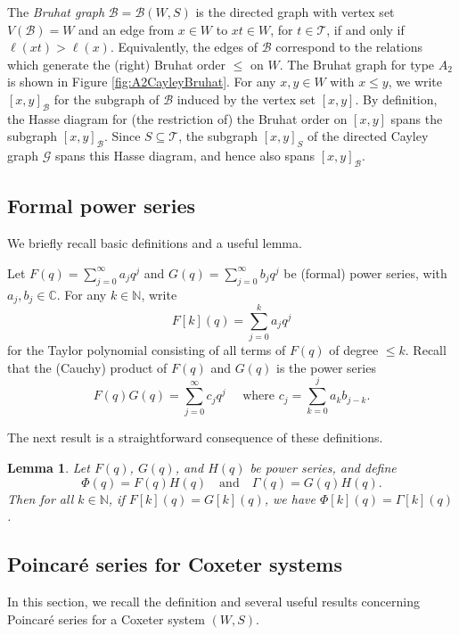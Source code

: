 \documentclass[11pt]{amsart}
\theoremstyle{plain}
\newtheorem{lemma}[thm]{Lemma}
\theoremstyle{definition}
\newcommand{\cG}{\mathcal{G}}
\newcommand{\N}{\mathbb{N}}
\newcommand{\C}{\mathbb{C}}
\newcommand{\cB}{\mathcal B}
\newcommand{\cT}{\mathcal T}
\numberwithin{equation}{subsection}
\begin{document}
The \emph{Bruhat graph} $\cB = \cB(W,S)$ is the directed graph with vertex set $V(\cB) = W$ and an edge from $x \in W$ to $xt \in W$, for $t \in \cT$,  if and only if $\ell(xt) > \ell(x)$. Equivalently, the edges of $\cB$ correspond to the relations which generate the (right) Bruhat order $\leq$ on $W$. The Bruhat graph for type $A_2$ is shown in Figure \ref{fig:A2CayleyBruhat}. For any $x, y \in W$ with $x \leq y$, we write $[x,y]_\cB$ for the subgraph of $\cB$ induced by the vertex set $[x,y]$. By definition, the Hasse diagram for (the restriction of) the Bruhat order on $[x,y]$ spans the subgraph $[x,y]_\cB$. Since $S \subseteq \cT$, the subgraph $[x,y]_S$ of the directed Cayley graph $\cG$ spans this Hasse diagram, and hence also spans $[x,y]_\cB$. 



\subsection{Formal power series}\label{sec:powerSeries}

We briefly recall basic definitions and a useful lemma.

Let $F(q) = \sum_{j=0}^\infty a_j q^j$ and $G(q) = \sum_{j=0}^\infty b_j q^j$ 
be (formal) power series, with $a_j, b_j \in \C$. For any $k \in \N$, write 
\[
F[k](q) = \sum_{j=0}^k a_j q^j
\]
for the Taylor polynomial consisting of all terms of $F(q)$ of degree $\leq k$.  
Recall that the (Cauchy) product of $F(q)$ and $G(q)$ is the power series
\[
F(q) G(q) = \sum_{j=0}^\infty c_j q^j \quad \mbox{ where } c_j = \sum_{k=0}^j a_k b_{j-k}.
\]

The next result is a straightforward consequence of these definitions.

\begin{lemma}\label{lem:power-series-product-agreement}
	Let $F(q)$, $G(q)$, and $H(q)$ be power series, and define \[ \Phi(q) = F(q)H(q) \quad \mbox{and} \quad \Gamma(q) = G(q)H(q).\]
	Then for all $k \in \N$, if $F[k](q) = G[k](q)$, we have $\Phi[k](q) = \Gamma[k](q)$. 
\end{lemma}



\subsection{Poincar\'e series for Coxeter systems}\label{sec:poincare}

In this section, we recall the definition and several useful results concerning Poincar\'e series for a Coxeter system $(W,S)$. 
\end{document}
